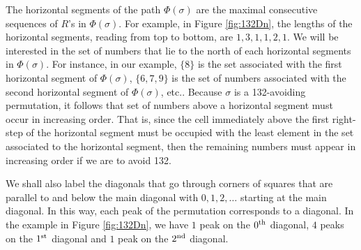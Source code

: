 \documentclass[
final,nomarks
]{dmtcs-episciences}
\newcommand{\fref}[1]{Figure \ref{fig:#1}}
\begin{document}
The horizontal segments of the path \begin{math}\Phi(\sigma)\end{math} are the maximal consecutive 
sequences of \begin{math}R\end{math}'s in \begin{math}\Phi(\sigma)\end{math}. For example, in \fref{132Dn}, the lengths of 
the horizontal segments, reading from top to bottom, are \begin{math}1,3,1,1,2,1\end{math}.  We will be interested in the set of numbers 
that lie to the north of each horizontal segments in \begin{math}\Phi(\sigma)\end{math}.  For instance, 
in our example,  \begin{math}\{8\}\end{math} is the set associated with the first horizontal segment of  
\begin{math}\Phi(\sigma)\end{math}, \begin{math}\{6,7,9\}\end{math} is the set of numbers associated with the second horizontal segment of  
\begin{math}\Phi(\sigma)\end{math}, etc..  Because \begin{math}\sigma\end{math} is a 132-avoiding permutation, it follows 
that set of numbers above a horizontal segment must occur in increasing order. 
That is, since the cell immediately above the first right-step of the horizontal segment 
must be occupied with the least element in the set associated to the horizontal segment, 
then the remaining numbers must appear in increasing order if we are to avoid 132. 



We shall also label the diagonals that go through corners of squares 
that are parallel to and below the main diagonal with \begin{math}0, 1, 2, \ldots \end{math} starting at the main 
diagonal.  In this way, each peak of the permutation corresponds to a diagonal. 
In the example in \fref{132Dn}, we have \begin{math}1\end{math} peak on the \begin{math}0^{\textnormal{th}}\end{math} diagonal, \begin{math}4\end{math} peaks on the \begin{math}1^{\textnormal{st}}\end{math} diagonal and \begin{math}1\end{math} peak on the \begin{math}2^{\textnormal{nd}}\end{math} diagonal. 
\end{document}
